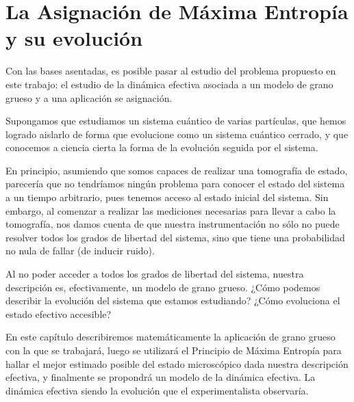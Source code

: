 \chapter{La Asignación de Máxima Entropía y su evolución}\label{sec:chapter2}


Con las bases asentadas, es posible pasar al estudio del problema propuesto en este trabajo: el estudio de la dinámica efectiva asociada a un modelo de grano grueso y a una aplicación se asignación.

Supongamos que estudiamos un sistema cuántico de varias partículas, que hemos logrado aislarlo de forma que evolucione como un sistema cuántico cerrado, y que conocemos a ciencia cierta la forma de la evolución seguida por el sistema.

En principio, asumiendo que somos capaces de realizar una tomografía de estado, parecería que no tendríamos ningún problema para conocer el estado del sistema a un tiempo arbitrario, pues tenemos acceso al estado inicial del sistema. Sin embargo, al comenzar a realizar las mediciones necesarias para llevar a cabo la tomografía, nos damos cuenta de que nuestra instrumentación no sólo no puede resolver todos los grados de libertad del sistema, sino que tiene una probabilidad no nula de fallar (de inducir ruido).

Al no poder acceder a todos los grados de libertad del sistema, nuestra descripción es, efectivamente, un modelo de grano grueso. ¿Cómo podemos describir la evolución del sistema que estamos estudiando? ¿Cómo evoluciona el estado efectivo accesible?

En este capítulo describiremos matemáticamente la aplicación de grano grueso con la que se trabajará, luego se utilizará el Principio de Máxima Entropía para hallar el mejor estimado posible del estado microscópico dada nuestra descripción efectiva, y finalmente se propondrá un modelo de la dinámica efectiva. La dinámica efectiva siendo la evolución que el experimentalista observaría.





\newpage

